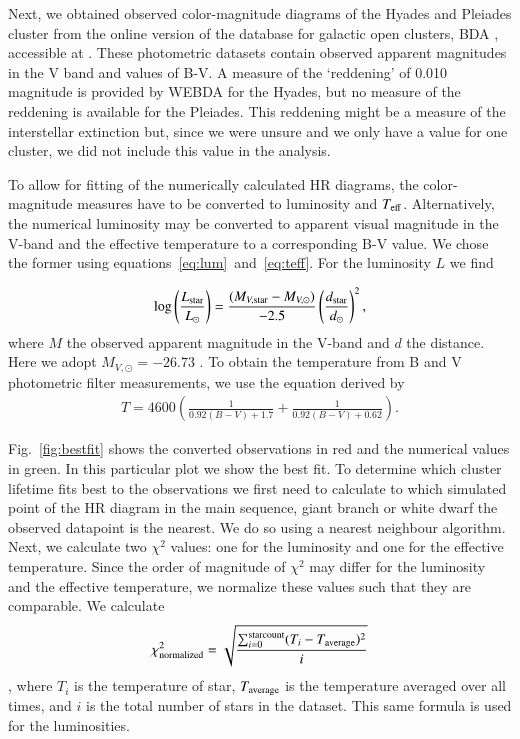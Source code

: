 \documentclass{aa}
\newcommand{\Sun}[0]{\ensuremath{_{\odot}}}
\begin{document}
    Next, we obtained observed color-magnitude diagrams of the Hyades and Pleiades cluster from the online version of the database for galactic open clusters, BDA \citep{1995ASSL..203..127M}, accessible at \citep{webda}. These photometric datasets contain observed apparent magnitudes in the V band and values of B-V. A measure of the `reddening' of 0.010 magnitude is provided by WEBDA for the Hyades, but no measure of the reddening is available for the Pleiades. This reddening might be a measure of the interstellar extinction but, since we were unsure and we only have a value for one cluster, we did not include this value in the analysis. 

    To allow for fitting of the numerically calculated HR diagrams, the color-magnitude measures have to be converted to luminosity and $T_{\rm eff}$. Alternatively, the numerical luminosity may be converted to apparent visual magnitude in the V-band and the effective temperature to a corresponding B-V value. We chose the former using equations~\eqref{eq:lum}~and~\eqref{eq:teff}. For the luminosity $L$ we find


\begin{eqnarray}
    \log \left(\frac{L_{\rm star}}{L\Sun}\right) = \frac{(M_{V,\rm star}-M_{V,\odot})}{-2.5} \left(\frac{d_{\rm star}}{d\Sun}\right)^2 \label{eq:lum},
\end{eqnarray}
where $M$ the observed apparent magnitude in the V-band and $d$ the distance. Here we adopt $M_{V, \odot} = -26.73$ \citep{1957ApJ...126..266S}. To obtain the temperature from B and V photometric filter measurements, we use the equation derived by \citet{2012EL.....9734008B}
\begin{eqnarray}
    T = 4600 \left(\frac{1}{0.92 (B-V) + 1.7} + \frac{1}{0.92(B-V) + 0.62} \right) \label{eq:teff}.
\end{eqnarray}

Fig.~\ref{fig:bestfit} shows the converted observations in red and the numerical values in green. In this particular plot we show the best fit. To determine which cluster lifetime fits best to the observations we first need to calculate to which simulated point of the HR diagram in the main sequence, giant branch or white dwarf the observed datapoint is the nearest. We do so using a nearest neighbour algorithm. Next, we calculate two $\chi^2$ values: one for the luminosity and one for the effective temperature. Since the order of magnitude of $\chi^2$ may differ for the luminosity and the effective temperature, we normalize these values such that they are comparable. We calculate $$\chi^2_{\rm normalized} = \sqrt{\frac{\sum_{i=0}^{\rm starcount} (T_i - T_{\rm average})^2}{i}}$$, where $T_i$ is the temperature of star, $T_{\rm average}$ is the temperature averaged over all times, and $i$ is the total number of stars in the dataset. This same formula is used for the luminosities.
\end{document}
